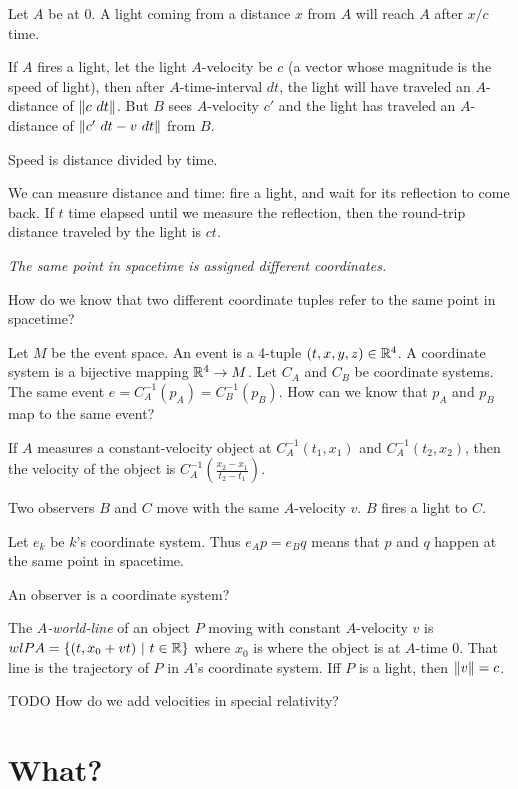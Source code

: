 Let \(A\) be at 0.
A light coming from a distance \(x\) from \(A\) will reach \(A\) after \(x/c\) time.

If \(A\) fires a light, let the light \(A\)-velocity be \(c\)
(a vector whose magnitude is the speed of light),
then after \(A\)-time-interval \(dt\),
the light will have traveled an \(A\)-distance of \(\norm{c ~ dt}\).
But \(B\) sees \(A\)-velocity \(c'\) and the light has traveled an \(A\)-distance of \(\norm{c' ~ dt - v ~ dt}\) from \(B\).

Speed is distance divided by time.

We can measure distance and time:
fire a light, and wait for its reflection to come back.
If \(t\) time elapsed until we measure the reflection, then the round-trip distance traveled by the light is \(ct\).

\emph{The same point in spacetime is assigned different coordinates.}

How do we know that two different coordinate tuples refer to the same point in spacetime?

Let \(M\) be the event space.
An event is a 4-tuple \((t,x,y,z) \in \mathbb{R}^4\).
A coordinate system is a bijective mapping \(\mathbb{R}^4 \to M\).
Let \(C_A\) and \(C_B\) be coordinate systems.
The same event \(e = C_A^{-1}(p_A) = C_B^{-1}(p_B)\).
How can we know that \(p_A\) and \(p_B\) map to the same event?

If \(A\) measures a constant-velocity object at \(C_A^{-1}(t_1,x_1)\) and \(C_A^{-1}(t_2,x_2)\),
then the velocity of the object is \(C_A^{-1}\left(\frac{x_2-x_1}{t_2-t_1}\right)\).

Two observers \(B\) and \(C\) move with the same \(A\)-velocity \(v\).
\(B\) fires a light to \(C\).

Let \(e_k\) be \(k\)'s coordinate system.
Thus \(e_A p = e_B q\) means that \(p\) and \(q\) happen at the same point in spacetime.

An observer is a coordinate system?

The \emph{\(A\)-world-line} of an object \(P\) moving with constant \(A\)-velocity \(v\)
is \( wlPA = \{ (t, x_0 + v t) ~|~ t \in \mathbb{R} \} \)
where \(x_0\) is where the object is at \(A\)-time 0.
That line is the trajectory of \(P\) in \(A\)'s coordinate system.
Iff \(P\) is a light, then \(\norm{v} = c\).

TODO How do we add velocities in special relativity?

\section{What?}

